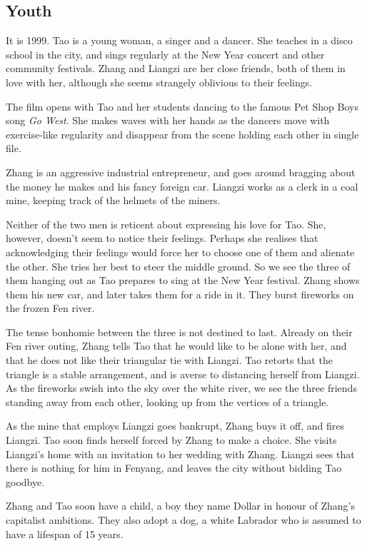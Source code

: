 \documentclass{article}
\begin{document}
\subsection{Youth}
\label{sec:jfdg3q3z}

It is 1999.  Tao is a young woman, a singer and a dancer.  She teaches
in a disco school in the city, and sings regularly at the New Year
concert and other community festivals.  Zhang and Liangzi are her
close friends, both of them in love with her, although she seems
strangely oblivious to their feelings.

The film opens with Tao and her students dancing to the famous Pet
Shop Boys song \emph{Go West}.  She makes waves with her hands as the
dancers move with exercise-like regularity and disappear from the
scene holding each other in single file.

Zhang is an aggressive industrial entrepreneur, and goes around
bragging about the money he makes and his fancy foreign car.  Liangzi
works as a clerk in a coal mine, keeping track of the helmets of the
miners.

Neither of the two men is reticent about expressing his love for Tao.
She, however, doesn't seem to notice their feelings.  Perhaps she
realises that acknowledging their feelings would force her to choose
one of them and alienate the other.  She tries her best to steer the
middle ground.  So we see the three of them hanging out as Tao
prepares to sing at the New Year festival.  Zhang shows them his new
car, and later takes them for a ride in it.  They burst fireworks on
the frozen Fen river.  

The tense bonhomie between the three is not destined to last.  Already
on their Fen river outing, Zhang tells Tao that he would like to be
alone with her, and that he does not like their triangular tie with
Liangzi.  Tao retorts that the triangle is a stable arrangement, and
is averse to distancing herself from Liangzi.  As the fireworks swish
into the sky over the white river, we see the three friends standing
away from each other, looking up from the vertices of a triangle.

As the mine that employs Liangzi goes bankrupt, Zhang buys it off, and
fires Liangzi.  Tao soon finds herself forced by Zhang to make a
choice.  She visits Liangzi's home with an invitation to her wedding
with Zhang.  Liangzi sees that there is nothing for him in Fenyang,
and leaves the city without bidding Tao goodbye.

Zhang and Tao soon have a child, a boy they name Dollar in honour of
Zhang's capitalist ambitions.  They also adopt a dog, a white Labrador
who is assumed to have a lifespan of 15 years.
\end{document}
